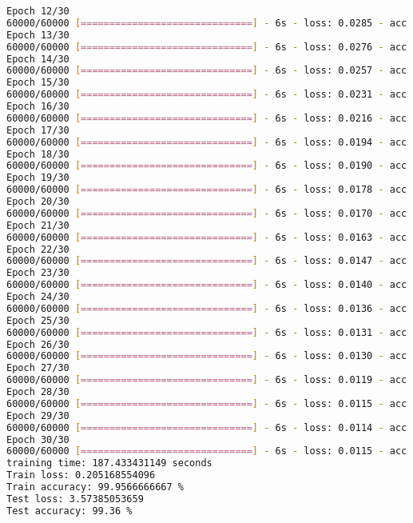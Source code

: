 \begin{lstlisting}[language=bash]
Epoch 12/30
60000/60000 [==============================] - 6s - loss: 0.0285 - acc: 0.9924 - val_loss: 0.0269 - val_acc: 0.9931
Epoch 13/30
60000/60000 [==============================] - 6s - loss: 0.0276 - acc: 0.9932 - val_loss: 0.0286 - val_acc: 0.9930
Epoch 14/30
60000/60000 [==============================] - 6s - loss: 0.0257 - acc: 0.9934 - val_loss: 0.0259 - val_acc: 0.9938
Epoch 15/30
60000/60000 [==============================] - 6s - loss: 0.0231 - acc: 0.9943 - val_loss: 0.0273 - val_acc: 0.9933
Epoch 16/30
60000/60000 [==============================] - 6s - loss: 0.0216 - acc: 0.9944 - val_loss: 0.0310 - val_acc: 0.9931
Epoch 17/30
60000/60000 [==============================] - 6s - loss: 0.0194 - acc: 0.9950 - val_loss: 0.0302 - val_acc: 0.9934
Epoch 18/30
60000/60000 [==============================] - 6s - loss: 0.0190 - acc: 0.9949 - val_loss: 0.0282 - val_acc: 0.9931
Epoch 19/30
60000/60000 [==============================] - 6s - loss: 0.0178 - acc: 0.9951 - val_loss: 0.0277 - val_acc: 0.9937
Epoch 20/30
60000/60000 [==============================] - 6s - loss: 0.0170 - acc: 0.9958 - val_loss: 0.0318 - val_acc: 0.9933
Epoch 21/30
60000/60000 [==============================] - 6s - loss: 0.0163 - acc: 0.9958 - val_loss: 0.0307 - val_acc: 0.9934
Epoch 22/30
60000/60000 [==============================] - 6s - loss: 0.0147 - acc: 0.9963 - val_loss: 0.0296 - val_acc: 0.9939
Epoch 23/30
60000/60000 [==============================] - 6s - loss: 0.0140 - acc: 0.9962 - val_loss: 0.0372 - val_acc: 0.9929
Epoch 24/30
60000/60000 [==============================] - 6s - loss: 0.0136 - acc: 0.9964 - val_loss: 0.0340 - val_acc: 0.9933
Epoch 25/30
60000/60000 [==============================] - 6s - loss: 0.0131 - acc: 0.9968 - val_loss: 0.0292 - val_acc: 0.9936
Epoch 26/30
60000/60000 [==============================] - 6s - loss: 0.0130 - acc: 0.9965 - val_loss: 0.0308 - val_acc: 0.9935
Epoch 27/30
60000/60000 [==============================] - 6s - loss: 0.0119 - acc: 0.9966 - val_loss: 0.0284 - val_acc: 0.9940
Epoch 28/30
60000/60000 [==============================] - 6s - loss: 0.0115 - acc: 0.9968 - val_loss: 0.0340 - val_acc: 0.9932
Epoch 29/30
60000/60000 [==============================] - 6s - loss: 0.0114 - acc: 0.9970 - val_loss: 0.0351 - val_acc: 0.9935
Epoch 30/30
60000/60000 [==============================] - 6s - loss: 0.0115 - acc: 0.9970 - val_loss: 0.0357 - val_acc: 0.9936
training time: 187.433431149 seconds
Train loss: 0.205168554096
Train accuracy: 99.9566666667 %
Test loss: 3.57385053659
Test accuracy: 99.36 %
	
\end{lstlisting}

